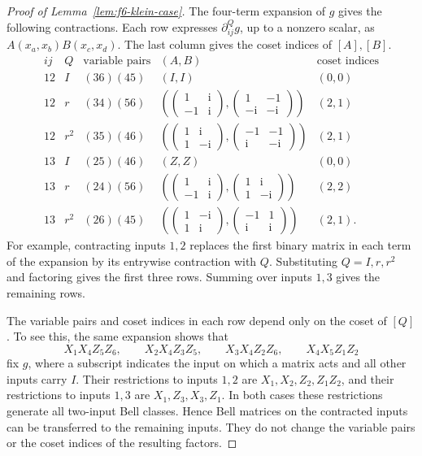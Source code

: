 \begin{proof}[Proof of Lemma~\ref{lem:f6-klein-case}]
The four-term expansion of $g$ gives the following contractions.
Each row expresses $\partial_{ij}^Qg$, up to a nonzero scalar,
as $A(x_a,x_b)B(x_c,x_d)$.
The last column gives the coset indices of $[A],[B]$.
\[
\begin{array}{cc|c|c|c}
ij&Q&\text{variable pairs}&(A,B)&\text{coset indices}\\ \hline
12&I&(36)(45)&(I,I)&(0,0)\\
12&r&(34)(56)&
\left(
\begin{pmatrix}1&\mathrm i\\-1&\mathrm i\end{pmatrix},
\begin{pmatrix}1&-1\\-\mathrm i&-\mathrm i\end{pmatrix}
\right)&(2,1)\\
12&r^2&(35)(46)&
\left(
\begin{pmatrix}1&\mathrm i\\1&-\mathrm i\end{pmatrix},
\begin{pmatrix}-1&-1\\\mathrm i&-\mathrm i\end{pmatrix}
\right)&(2,1)\\
13&I&(25)(46)&(Z,Z)&(0,0)\\
13&r&(24)(56)&
\left(
\begin{pmatrix}1&\mathrm i\\-1&\mathrm i\end{pmatrix},
\begin{pmatrix}1&\mathrm i\\1&-\mathrm i\end{pmatrix}
\right)&(2,2)\\
13&r^2&(26)(45)&
\left(
\begin{pmatrix}1&-\mathrm i\\1&\mathrm i\end{pmatrix},
\begin{pmatrix}-1&1\\\mathrm i&\mathrm i\end{pmatrix}
\right)&(2,1).
\end{array}
\]
For example, contracting inputs $1,2$ replaces the first binary
matrix in each term of the expansion by its entrywise contraction
with $Q$. Substituting $Q=I,r,r^2$ and factoring gives the first
three rows. Summing over inputs $1,3$ gives the remaining rows.

The variable pairs and coset indices in each row depend only on
the coset of $[Q]$.
To see this, the same expansion shows that
\[
X_1X_4Z_5Z_6,\qquad
X_2X_4Z_3Z_5,\qquad
X_3X_4Z_2Z_6,\qquad
X_4X_5Z_1Z_2
\]
fix $g$, where a subscript indicates the input on which a matrix
acts and all other inputs carry $I$.
Their restrictions to inputs $1,2$ are
$X_1,X_2,Z_2,Z_1Z_2$, and their restrictions to inputs $1,3$ are
$X_1,Z_3,X_3,Z_1$.
In both cases these restrictions generate all two-input Bell
classes. Hence Bell matrices on the contracted inputs can be
transferred to the remaining inputs. They do not change the
variable pairs or the coset indices of the resulting factors.


\end{proof}
